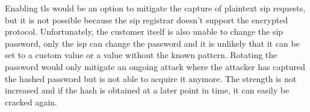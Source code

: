 Enabling \gls{tls} \cite{rfc8446} would be an option to mitigate the capture of plaintext \gls{sip} requests, but it is not possible because the \gls{sip} registrar doesn’t support the encrypted protocol. Unfortunately, the customer itself is also unable to change the \gls{sip} password, only the \gls{isp} can change the password and it is unlikely that it can be set to a custom value or a value without the known pattern. Rotating the password would only mitigate an ongoing attack where the attacker has captured the hashed password but is not able to acquire it anymore. The strength is not increased and if the hash is obtained at a later point in time, it can easily be cracked again.

\FloatBarrier
